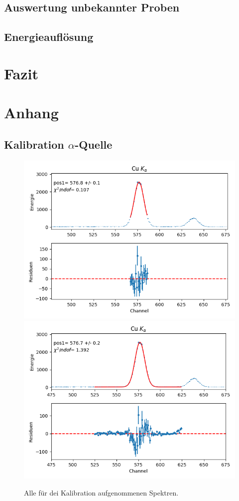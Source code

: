 \documentclass[12pt,a4paper]{article}
\begin{document}
\subsection{Auswertung unbekannter Proben}
\subsection{Energieauflösung}

\section{Fazit}
\newpage 
\section{Anhang}
\subsection{Kalibration $\alpha$-Quelle}
\begin{figure}[H]
\centering
\includegraphics[scale=0.8]{Bilder/alpha/cu_alpha_1.png}
\includegraphics[scale=0.8]{Bilder/alpha/cu_alpha_2.png}
\caption{Alle für dei Kalibration aufgenommenen Spektren.}
\label{fig:kal_alles}
\end{figure}
\end{document}

